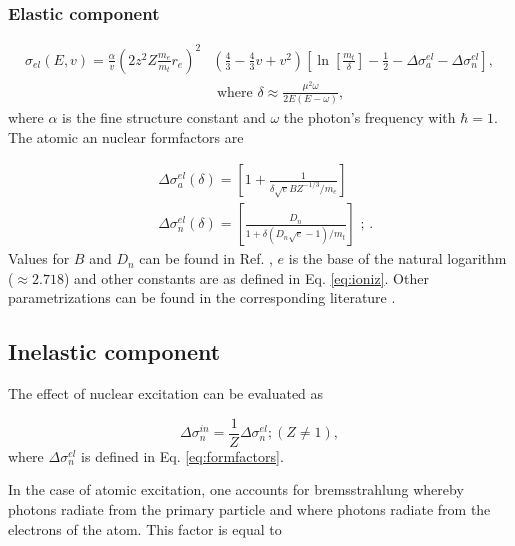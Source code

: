\subsubsection{Elastic component}
\begin{equation}
\begin{split}
\sigma_{el} (E,v) = \frac{ \alpha}{v} \left(2 z^2 Z \frac{m_e}{m_t} r_e\right)^2
 &\left(\frac{4}{3} - \frac{4}{3}v +v^2 \right) \left[\ln \left[\frac{m_t}{\delta}\right] - \frac{1}{2} - \Delta \sigma^{el}_a -\Delta \sigma^{el}_ n \right],\\
& \textrm{ \ \ where \ \ } \delta \approx \frac{\mu^2 \omega}{2E(E-\omega)},
\end{split}
\end{equation}
where $\alpha$ is the fine structure constant and $\omega$ the photon's frequency with $\hbar = 1$. The atomic an nuclear formfactors are

\begin{equation}
\label{eq:formfactors}
\begin{split}
&\Delta \sigma^{el}_a(\delta) = \left[ 1+ \frac{1}{\delta \sqrt{e} BZ^{-1/3}/m_e}\right] \\
&\Delta \sigma^{el}_n(\delta) = \left[\frac{D_n}{1+\delta (D_n \sqrt{e} -1)/m_t}\right] \textrm{ \ \ ; }.
\end{split}
\end{equation}
Values for $B$ and $D_n$ can be found in Ref. \cite{Kelner:1995hu}, $e$ is the base of the natural logarithm ($\approx 2.718$) and other constants are as defined in Eq. \ref{eq:ioniz}. Other parametrizations can be found in the corresponding literature \cite{Chirkin:2004hz}. 

\subsection{Inelastic component}

The effect of nuclear excitation can be evaluated as

\begin{equation}
\Delta \sigma^{in}_n = \frac{1}{Z} \Delta \sigma^{el}_n; (Z \neq 1),
 \end{equation}
where $\Delta \sigma^{el}_n$ is defined in Eq. \ref{eq:formfactors}.

In the case of atomic excitation, one accounts for bremsstrahlung whereby photons radiate from the primary particle and where photons radiate from the electrons of the atom. This factor is equal to

